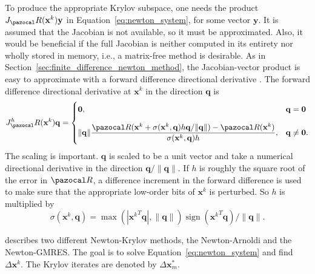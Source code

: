 To produce the appropriate Krylov subspace, one needs the product \(J_\pazocal R(\mathbf x^k) \mathbf y\) in Equation~\eqref{eq:newton_system}, for some vector \(\mathbf y\).
It is assumed that the Jacobian is not available, so it must be approximated.
Also, it would be beneficial if the full Jacobian is neither computed in its entirety nor wholly stored in memory, i.e., a matrix-free method is desirable.
As in Section~\ref{sec:finite_difference_newton_method}, the Jacobian-vector product is easy to approximate with a forward difference directional derivative \citep{kelley_solving_2003}.
The forward difference directional derivative at \(\mathbf x^k\) in the direction \(\mathbf q\) is
\begin{equation}
  J^h_\pazocal R(\mathbf x^k)\mathbf q =
\begin{cases}
  \mathbf 0, & \mathbf q = \mathbf 0 \\[10pt]
  \|\mathbf q\| \displaystyle\frac{\pazocal R(\mathbf x^k+\sigma(\mathbf x^k, \mathbf q) h \mathbf q /\|\mathbf q\|)-\pazocal R(\mathbf x^k)}{\sigma(\mathbf x^k, \mathbf q) h}, & \mathbf q \neq \mathbf 0 .
  \end{cases}
\end{equation}
The scaling is important.
\(\mathbf q\) is scaled to be a unit vector and take a numerical directional derivative in the direction \(\mathbf q /\|\mathbf q\|\).
If \(h\) is roughly the square root of the error in \(\pazocal R\), a difference increment in the forward difference is used to make sure that the appropriate low-order bits of \(\mathbf x^k\) is perturbed.
So \(h\) is multiplied by
\begin{equation}
  \sigma(\mathbf x^k, \mathbf q)=\max (|{\mathbf x^k}^{T} \mathbf q|,\|\mathbf q\|) \operatorname{sign}({\mathbf x^k}^{T} \mathbf q) /\|\mathbf q\| .
\end{equation}

\cite{sidi_vector_2017} describes two different Newton-Krylov methods, the Newton-Arnoldi and the Newton-GMRES.
The goal is to solve Equation~\eqref{eq:newton_system} and find \(\Delta \mathbf x^k\).
The Krylov iterates are denoted by \(\Delta \mathbf x^*_m\).

